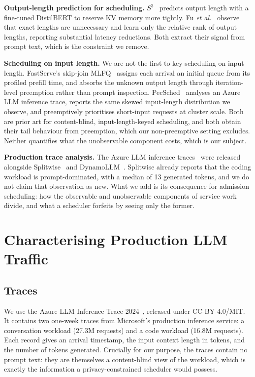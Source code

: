 \documentclass[conference,10pt,letterpaper]{IEEEtran}
\begin{document}
\textbf{Output-length prediction for scheduling.}
$S^3$~\cite{jin2023s3} predicts output length with a fine-tuned DistilBERT to
reserve KV memory more tightly. Fu \emph{et al.}~\cite{fu2024ltr} observe that
exact lengths are unnecessary and learn only the relative rank of output
lengths, reporting substantial latency reductions. Both extract their signal
from prompt text, which is the constraint we remove.

\textbf{Scheduling on input length.}
We are not the first to key scheduling on input length. FastServe's skip-join
MLFQ~\cite{wu2026fastserve} assigns each arrival an initial queue from its
profiled prefill time, and absorbs the unknown output length through
iteration-level preemption rather than prompt inspection.
PecSched~\cite{pecsched} analyses an Azure LLM inference trace, reports the same
skewed input-length distribution we observe, and preemptively prioritises
short-input requests at cluster scale. Both are prior art for content-blind,
input-length-keyed scheduling, and both obtain their tail behaviour from
preemption, which our non-preemptive setting excludes. Neither quantifies what
the unobservable component costs, which is our subject.

\textbf{Production trace analysis.}
The Azure LLM inference traces~\cite{azurepublicdataset} were released alongside
Splitwise~\cite{patel2024splitwise} and DynamoLLM~\cite{stojkovic2025dynamollm}.
Splitwise already reports that the coding workload is prompt-dominated, with a
median of 13 generated tokens, and we do not claim that observation as new. What
we add is its consequence for admission scheduling: how the observable and
unobservable components of service work divide, and what a scheduler forfeits by
seeing only the former.

\section{Characterising Production LLM Traffic}
\label{sec:characterisation}

\subsection{Traces}
We use the Azure LLM Inference Trace 2024~\cite{azurepublicdataset}, released
under CC-BY-4.0/MIT. It contains two one-week traces from Microsoft's production
inference service: a conversation workload (27.3M requests) and a
code workload (16.8M requests). Each record gives an arrival timestamp,
the input context length in tokens, and the number of tokens generated. Crucially
for our purpose, the traces contain no prompt text: they are themselves
a content-blind view of the workload, which is exactly the information a
privacy-constrained scheduler would possess.
\end{document}
